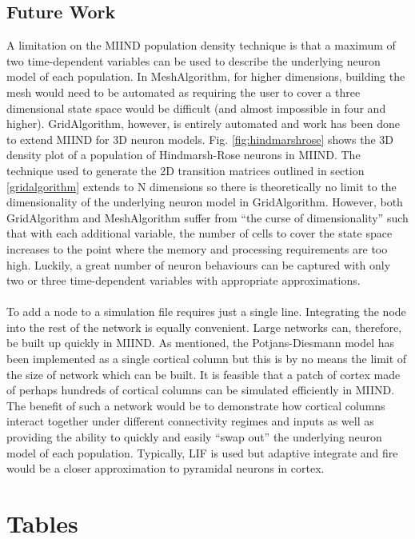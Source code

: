 \documentclass[utf8]{frontiersSCNS} %
\begin{document}
\subsection*{Future Work}
A limitation on the MIIND population density technique is that a maximum of two time-dependent variables can be used to describe the underlying neuron model of each population. In MeshAlgorithm, for higher dimensions, building the mesh would need to be automated as requiring the user to cover a three dimensional state space would be difficult (and almost impossible in four and higher). GridAlgorithm, however, is entirely automated and work has been done to extend MIIND for 3D neuron models. Fig. \ref{fig:hindmarshrose} shows the 3D density plot of a population of Hindmarsh-Rose neurons in MIIND. The technique used to generate the 2D transition matrices outlined in section \ref{gridalgorithm} extends to N dimensions so there is theoretically no limit to the dimensionality of the underlying neuron model in GridAlgorithm. However, both GridAlgorithm and MeshAlgorithm suffer from ``the curse of dimensionality'' such that with each additional variable, the number of cells to cover the state space increases to the point where the memory and processing requirements are too high. Luckily, a great number of neuron behaviours can be captured with only two or three time-dependent variables with appropriate approximations.\\
\\
To add a node to a simulation file requires just a single line. Integrating the node into the rest of the network is equally convenient. Large networks can, therefore, be built up quickly in MIIND. As mentioned, the Potjans-Diesmann model has been implemented as a single cortical column but this is by no means the limit of the size of network which can be built. It is feasible that a patch of cortex made of perhaps hundreds of cortical columns can be simulated efficiently in MIIND. The benefit of such a network would be to demonstrate how cortical columns interact together under different connectivity regimes and inputs as well as providing the ability to quickly and easily ``swap out'' the underlying neuron model of each population. Typically, LIF is used but adaptive integrate and fire would be a closer approximation to pyramidal neurons in cortex.


\section*{Tables}
\end{document}
